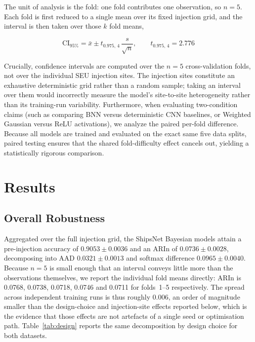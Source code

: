 \documentclass[a4paper,twoside]{article}
\begin{document}
The unit of analysis is the fold: one fold contributes one observation, so
$n=5$. Each fold is first reduced to a single mean over its fixed injection
grid, and the interval is then taken over those $k$ fold means,

\begin{equation}
\label{eq:ci}
\mathrm{CI}_{95\%} = \bar{x} \pm t_{0.975,\,4}\,\frac{s}{\sqrt{n}},
\qquad t_{0.975,\,4} = 2.776
\end{equation}

Crucially, confidence intervals are computed over the $n=5$ cross-validation folds, not over the individual SEU injection sites. The injection sites constitute an exhaustive deterministic grid rather than a random sample; taking an interval over them would incorrectly measure the model's site-to-site heterogeneity rather than its training-run variability. Furthermore, when evaluating two-condition claims (such as comparing BNN versus deterministic CNN baselines, or Weighted Gaussian versus ReLU activations), we analyze the paired per-fold difference. Because all models are trained and evaluated on the exact same five data splits, paired testing ensures that the shared fold-difficulty effect cancels out, yielding a statistically rigorous comparison.

\section{Results}
\label{sec:results}
%

\subsection{Overall Robustness}

Aggregated over the full injection grid, the ShipsNet Bayesian models attain a
pre-injection accuracy of $0.9053 \pm 0.0036$ and an ARIn of
$0.0736 \pm 0.0028$, decomposing into AAD $0.0321 \pm 0.0013$ and softmax
difference $0.0965 \pm 0.0040$. Because $n=5$ is small enough that an interval
conveys little more than the observations themselves, we report the individual
fold means directly: ARIn is 0.0768, 0.0738, 0.0718, 0.0746 and 0.0711 for
folds~1--5 respectively. The spread across independent training runs is thus
roughly 0.006, an order of magnitude smaller than the design-choice and
injection-site effects reported below, which is the evidence that those effects
are not artefacts of a single seed or optimisation path. Table~\ref{tab:design}
reports the same decomposition by design choice for both datasets.
\end{document}
